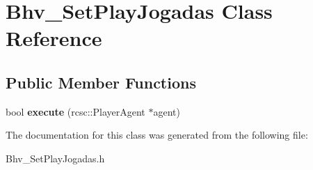 \hypertarget{classBhv__SetPlayJogadas}{
\section{Bhv\_\-SetPlayJogadas Class Reference}
\label{classBhv__SetPlayJogadas}
}
\subsection*{Public Member Functions}
\begin{DoxyCompactItemize}
\item 
\hypertarget{classBhv__SetPlayJogadas_a073ba34df6014c67c011e09d601fb7f0}{
bool {\bfseries execute} (rcsc::PlayerAgent $\ast$agent)}
\label{classBhv__SetPlayJogadas_a073ba34df6014c67c011e09d601fb7f0}

\end{DoxyCompactItemize}


The documentation for this class was generated from the following file:\begin{DoxyCompactItemize}
\item 
Bhv\_\-SetPlayJogadas.h\end{DoxyCompactItemize}
